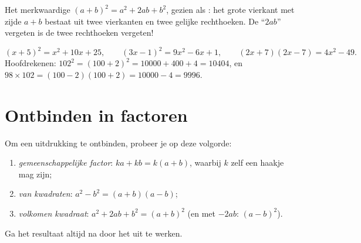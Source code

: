 \begin{omfigure}

{\small Het merkwaardige  $(a+b)^2 = a^2 + 2ab + b^2$, gezien als
: het grote vierkant met zijde $a+b$ bestaat uit twee vierkanten en
twee gelijke rechthoeken. De ``$2ab$'' vergeten is de twee rechthoeken vergeten!}
\end{omfigure}

\begin{example}\label{ex:g9:algebra:identities}
\[
(x + 5)^2 = x^2 + 10x + 25, \qquad
(3x - 1)^2 = 9x^2 - 6x + 1, \qquad
(2x + 7)(2x - 7) = 4x^2 - 49 .
\]
Hoofdrekenen: $102^2 = (100 + 2)^2 = 10000 + 400 + 4 = 10404$, en
$98 \times 102 = (100-2)(100+2) = 10000 - 4 = 9996$.
\end{example}

\section{Ontbinden in factoren}

\begin{method}\label{met:g9:algebra:factor}
Om een uitdrukking te ontbinden, probeer je op deze volgorde:
\begin{enumerate}
  \item \emph{gemeenschappelijke factor}: $ka + kb = k(a + b)$, waarbij $k$ zelf
        een haakje mag zijn;
  \item \emph{ van kwadraten}: $a^2 - b^2 = (a+b)(a-b)$;
  \item \emph{volkomen kwadraat}: $a^2 + 2ab + b^2 = (a+b)^2$ (en met $-2ab$:
        $(a-b)^2$).
\end{enumerate}
Ga het resultaat altijd na door het uit te werken.
\end{method}

